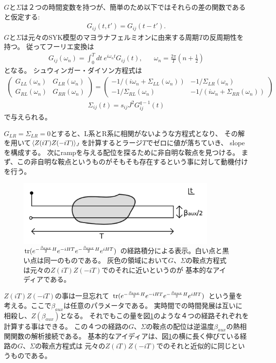 $G$と$\Sigma$は２つの時間変数を持つが、簡単のため以下ではそれらの差の関数であると仮定する:
\begin{align}
	G_{ij}(t, t') = G_{ij}(t - t').
\end{align}
$G$と$\Sigma$は元々のSYK模型のマヨラナフェルミオンに由来する周期$T$の反周期性を持つ。
従ってフーリエ変換は
\begin{align}
	G_{ij}(\omega_n) = \int_0^T dt\ e^{i\omega_nt}G_{ij}(t),
	\hspace{20pt}\omega_n = \frac{2\pi}{T}\left(n + \frac{1}{2}\right)
\end{align}
となる。
シュウィンガー・ダイソン方程式は
\begin{align}
	\begin{pmatrix}
		G_{LL}(\omega_n) & G_{LR}(\omega_n)\\
		G_{RL}(\omega_n) & G_{RR}(\omega_n)
	\end{pmatrix}
	=
	\begin{pmatrix}
		-1/(i\omega_n + \Sigma_{LL}(\omega_n)) & -1/\Sigma_{LR}(\omega_n)\\
		-1/\Sigma_{RL}(\omega_n) & -1/(i\omega_n + \Sigma_{RR}(\omega_n))
	\end{pmatrix}
	\label{eq:replica_SDeq_1}
\end{align}
\begin{align}
	\Sigma_{ij}(t) = s_{ij}J^2G_{ij}^{q-1}(t)
	\label{eq:replica_SDeq_2}
\end{align}
で与えられる。

$G_{LR} = \Sigma_{LR} = 0$とすると、L系とR系に相関がないような方程式となり、
その解を用いて$\langle Z(iT)Z(-iT) \rangle_J$を計算するとラージ$T$でゼロに値が落ちていき、
slopeを構成する。
次にrampを与える配位を探るために非自明な鞍点を見つける。
まず、この非自明な鞍点というものがそもそも存在するという事に対して動機付けを行う。

\begin{figure}[ht]
	\centering
	\includegraphics[width=10cm]{figures/beta_aux}
	\caption{$\mathrm{tr}(e^{-\frac{\beta_{aux}}{2}H}e^{-iHT}e^{-\frac{\beta_{aux}}{2}H}e^{iHT})$
		の経路積分による表示。白い点と黒い点は同一のものである。
		灰色の領域において$G$、$\Sigma$の鞍点方程式は元々の$Z(iT)Z(-iT)$でのそれに近いというのが
		基本的なアイディアである。
	}
	\label{fig:beta_aux}
\end{figure}
$Z(iT)Z(-iT)$の事は一旦忘れて
$\mathrm{tr}(e^{-\frac{\beta_{aux}}{2}H}e^{-iHT}e^{-\frac{\beta_{aux}}{2}H}e^{iHT})$
という量を考える。ここで$\beta_{aux}$は任意のパラメータである。
実時間での時間発展は互いに相殺し、$Z(\beta_{aux})$となる。
それでもこの量を図\ref{fig:beta_aux}のような４つの経路それぞれを計算する事はできる。
この４つの経路の$G$、$\Sigma$の鞍点の配位は逆温度$\beta_{aux}$の熱相関関数の解析接続である。
基本的なアイディアは、図\ref{fig:beta_aux}の横に長く伸びている経路の$G$、$\Sigma$の鞍点方程式は
元々の$Z(iT)Z(-iT)$でのそれと近似的に同じというものである。

